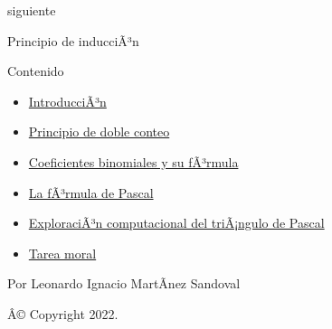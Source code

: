 \documentclass[
]{article}
\providecommand{\tightlist}{%
  \setlength{\itemsep}{0pt}\setlength{\parskip}{0pt}}
\begin{document}
siguiente

Principio de inducciÃ³n

\emph{}

\emph{} Contenido

\begin{itemize}
\tightlist
\item
  \hyperref[introduccion]{IntroducciÃ³n}
\item
  \hyperref[principio-de-doble-conteo]{Principio de doble conteo}
\item
  \hyperref[coeficientes-binomiales-y-su-formula]{Coeficientes
  binomiales y su fÃ³rmula}
\item
  \hyperref[la-formula-de-pascal]{La fÃ³rmula de Pascal}
\item
  \hyperref[exploracion-computacional-del-triangulo-de-pascal]{ExploraciÃ³n
  computacional del triÃ¡ngulo de Pascal}
\item
  \hyperref[tarea-moral]{Tarea moral}
\end{itemize}

Por Leonardo Ignacio MartÃ­nez Sandoval

Â© Copyright 2022.\\
\end{document}
